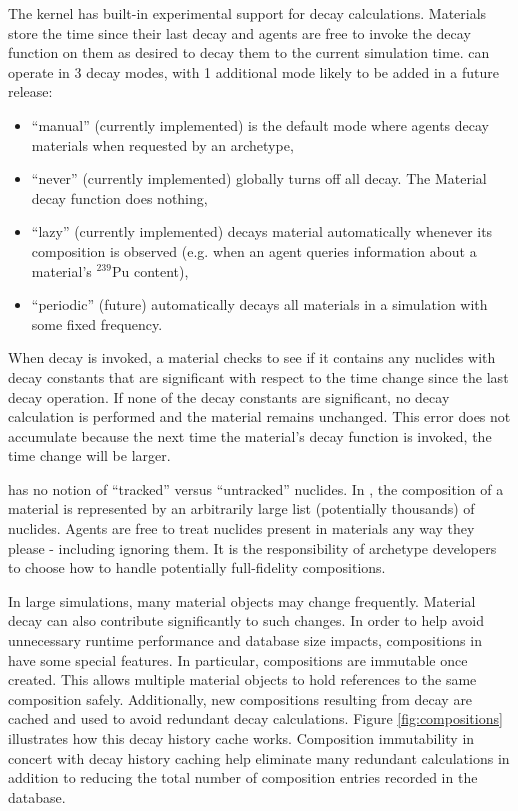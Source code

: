 The \Cyclus kernel has built-in experimental support for decay calculations.
Materials store the time since their last decay and agents are free to
invoke the decay function on them as desired to decay them to the current
simulation time. \Cyclus can operate in 3 decay modes, with 1 additional
mode likely to be added in a future release:

\begin{itemize}
    \item ``manual'' (currently implemented) is the default mode
        where agents decay materials when requested by an archetype,
    \item ``never'' (currently implemented) globally turns off all decay.
        The Material decay function does nothing,
    \item ``lazy'' (currently implemented) decays material automatically whenever
         its composition is observed (e.g. when an agent queries information
         about a material's $^{239}$Pu content),
    \item ``periodic'' (future) automatically decays all materials in a
        simulation with some fixed frequency.
\end{itemize}


When decay is invoked, a material checks to see if it contains any nuclides with
decay constants that are significant with respect to the time change since the
last decay operation.  If none of the decay constants are significant, no decay
calculation is performed and the material remains unchanged.  This error does
not accumulate because the next time the material's decay function is invoked,
the time change will be larger.

\Cyclus has no notion of ``tracked'' versus ``untracked'' nuclides.  In
\Cyclus, the composition of a material is represented by an arbitrarily large
list (potentially thousands) of nuclides.  Agents are free to treat nuclides
present in materials any way they please - including ignoring them.  It is the
responsibility of archetype developers to choose how to handle potentially
full-fidelity compositions.

In large simulations, many material objects may change frequently.  Material
decay can also contribute significantly to such changes.  In order to help
avoid unnecessary runtime performance and database size impacts, compositions
in \Cyclus have some special features.  In particular, compositions are
immutable once created. This allows multiple material objects to hold
references to the same composition safely.  Additionally, new compositions
resulting from decay are cached and used to avoid redundant decay
calculations.  Figure \ref{fig:compositions} illustrates how this decay
history cache works. Composition immutability in concert with decay history
caching help eliminate many redundant calculations in addition to reducing the
total number of composition entries recorded in the database.


